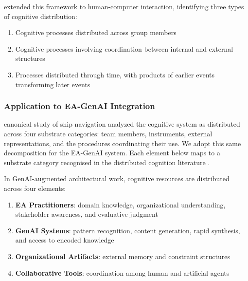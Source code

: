 \textcite{hollan_distributed_2000} extended this framework to human-computer
interaction, identifying three types of cognitive distribution:

\begin{enumerate}
      \item Cognitive processes distributed across group members
      \item Cognitive processes involving coordination between internal and
            external structures
      \item Processes distributed through time, with products of earlier events
            transforming later events
\end{enumerate}

\subsubsection{Application to EA-GenAI Integration}

\textcite{hutchins_cognition_1995} canonical study of ship navigation analyzed
the cognitive system as distributed across four substrate categories: team
members, instruments, external representations, and the procedures coordinating
their use. We adopt this same decomposition for the EA-GenAI system. Each
element below maps to a substrate category recognised in the distributed
cognition literature \parencite{hollan_distributed_2000,
perry_m_distributed_2003}.

In GenAI-augmented architectural work, cognitive resources are distributed
across four elements:

\begin{enumerate}
      \item \textbf{EA Practitioners}: domain knowledge, organizational
            understanding, stakeholder awareness, and evaluative judgment
            \parencite{perry_m_distributed_2003}
      \item \textbf{GenAI Systems}: pattern recognition, content generation,
            rapid synthesis, and access to encoded knowledge
            \parencite{brynjolfsson_generative_2025}
      \item \textbf{Organizational Artifacts}: external memory and constraint
            structures \parencite{zhang_representations_1994}
      \item \textbf{Collaborative Tools}: coordination among human and
            artificial agents \parencite{brynjolfsson_generative_2025}
\end{enumerate}

